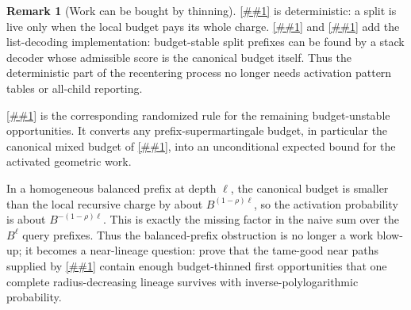 \documentclass[10pt]{article}
\newcommand{\cref}[1]{\ref{##1}}
\newcommand{\Cref}[1]{\ref{##1}}
\theoremstyle{definition}
\newtheorem{remark}[theorem]{Remark}
\begin{document}
\begin{remark}[Work can be bought by thinning]\label{rem:budget-thinning}
   \Cref{cor:budget-gated-splits} is deterministic: a split is live only when
   the local budget pays its whole charge.  \Cref{lem:budget-stable-prefix-list}
   and \cref{cor:canonical-budget-stable-decoder} add the list-decoding
   implementation: budget-stable split prefixes can be found by a stack
   decoder whose admissible score is the canonical budget itself.  Thus the
   deterministic part of the recentering process no longer needs activation
   pattern tables or all-child reporting.

   \Cref{lem:budget-thinned-opportunities} is the corresponding randomized
   rule for the remaining budget-unstable opportunities. It converts any
   prefix-supermartingale budget, in particular the canonical mixed budget of
   \cref{lem:canonical-mixed-budget}, into an unconditional expected bound for
   the activated geometric work.

   In a homogeneous balanced prefix at depth $\ell$, the canonical budget is smaller than the local recursive charge by about $B^{(1-\rho)\ell}$, so the activation probability is about $B^{-(1-\rho)\ell}$. This is exactly the missing factor in the naive sum over the $B^\ell$ query prefixes. Thus the balanced-prefix obstruction is no longer a work blow-up; it becomes a near-lineage question: prove that the tame-good near paths supplied by \cref{lem:adaptive-continuation} contain enough budget-thinned first opportunities that one complete radius-decreasing lineage survives with inverse-polylogarithmic probability.


\end{remark}
\end{document}
